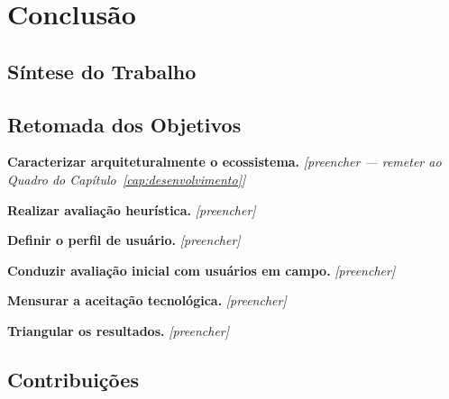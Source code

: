 \chapter{Conclusão}
\label{cap:conclusao}

\section{Síntese do Trabalho}
\label{sec:conc_sintese}


\section{Retomada dos Objetivos}
\label{sec:conc_objetivos}


\begin{alineas}
  \item \textbf{Caracterizar arquiteturalmente o ecossistema.} \textit{[preencher
  --- remeter ao Quadro do Capítulo~\ref{cap:desenvolvimento}]}

  \item \textbf{Realizar avaliação heurística.} \textit{[preencher]}

  \item \textbf{Definir o perfil de usuário.} \textit{[preencher]}

  \item \textbf{Conduzir avaliação inicial com usuários em campo.}
  \textit{[preencher]}

  \item \textbf{Mensurar a aceitação tecnológica.} \textit{[preencher]}

  \item \textbf{Triangular os resultados.} \textit{[preencher]}
\end{alineas}

\section{Contribuições}
\label{sec:conc_contribuicoes}

